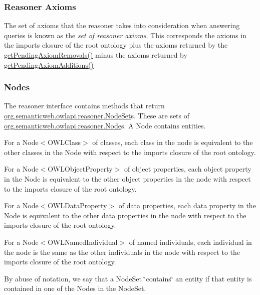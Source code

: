 \subsubsection*{Reasoner Axioms}

The set of axioms that the reasoner takes into consideration when answering queries is known as the {\itshape set of reasoner axioms}. This corresponds the axioms in the imports closure of the root ontology plus the axioms returned by the \hyperlink{interfaceorg_1_1semanticweb_1_1owlapi_1_1reasoner_1_1_o_w_l_reasoner_ae1d4e62a022475acab83d4e6e1871e25}{get\-Pending\-Axiom\-Removals()} minus the axioms returned by \hyperlink{interfaceorg_1_1semanticweb_1_1owlapi_1_1reasoner_1_1_o_w_l_reasoner_af1eaa30a1a5a96e7702666ba9b57b39b}{get\-Pending\-Axiom\-Additions()} 

\subsubsection*{Nodes}

The reasoner interface contains methods that return \hyperlink{}{org.\-semanticweb.\-owlapi.\-reasoner.\-Node\-Set}s. These are sets of \hyperlink{}{org.\-semanticweb.\-owlapi.\-reasoner.\-Node}s. A {\ttfamily Node} contains entities. 

For a {\ttfamily Node$<$O\-W\-L\-Class$>$} of classes, each class in the node is equivalent to the other classes in the {\ttfamily Node} with respect to the imports closure of the root ontology. 

For a {\ttfamily Node$<$O\-W\-L\-Object\-Property$>$} of object properties, each object property in the {\ttfamily Node} is equivalent to the other object properties in the node with respect to the imports closure of the root ontology. 

For a {\ttfamily Node$<$O\-W\-L\-Data\-Property$>$} of data properties, each data property in the {\ttfamily Node} is equivalent to the other data properties in the node with respect to the imports closure of the root ontology. 

For a {\ttfamily Node$<$O\-W\-L\-Named\-Individual$>$} of named individuals, each individual in the node is the same as the other individuals in the node with respect to the imports closure of the root ontology. 

By abuse of notation, we say that a {\ttfamily Node\-Set} \char`\"{}contains\char`\"{} an entity if that entity is contained in one of the {\ttfamily Nodes} in the {\ttfamily Node\-Set}. 

